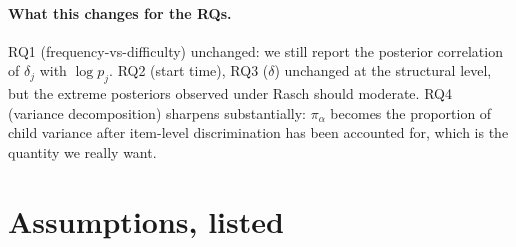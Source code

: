 \documentclass[11pt]{article}
\begin{document}
\paragraph{What this changes for the RQs.}
RQ1 (frequency-vs-difficulty) unchanged: we still report the posterior
correlation of \(\delta_j\) with \(\log p_j\). RQ2 (start time), RQ3
(\(\delta\)) unchanged at the structural level, but the extreme
posteriors observed under Rasch should moderate. RQ4 (variance
decomposition) sharpens substantially: \(\pi_\alpha\) becomes the
proportion of child variance after item-level discrimination has been
accounted for, which is the quantity we really want.

\section{Assumptions, listed}
\end{document}
